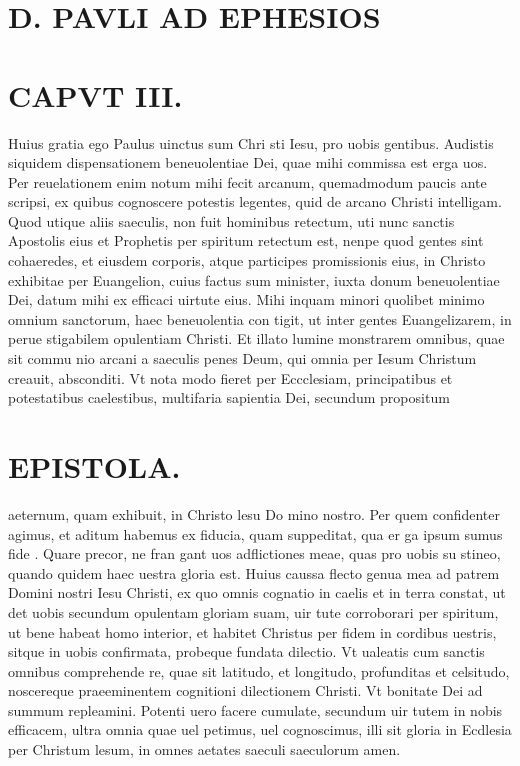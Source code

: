 \documentclass{article}
\begin{document}
\begin{pages}
\section*{D. PAVLI AD EPHESIOS }
\marginpar{[ p.1. ]}
\marginpar{[ p.2. ]}
\marginpar{[ p.3. ]}
\marginpar{[ p.4.  ]}
\section{CAPVT III. }\pstart Huius gratia ego Paulus uinctus sum Chri sti Iesu, pro uobis gentibus.  Audistis siquidem dispensationem beneuolentiae Dei, quae mihi commissa est erga uos. Per reuelationem enim notum mihi fecit arcanum, quemadmodum paucis ante scripsi, ex quibus  cognoscere potestis legentes, quid de arcano Christi intelligam.  \pend\pstart Quod utique  aliis saeculis, non fuit hominibus retectum, uti nunc sanctis Apostolis eius et Prophetis per spiritum retectum est, nenpe quod gentes sint cohaeredes, et eiusdem corporis, atque participes promissionis eius, in Christo exhibitae per Euangelion, cuius factus sum minister, iuxta donum beneuolentiae Dei, datum mihi ex efficaci uirtute eius.  \pend\pstart Mihi inquam minori quolibet minimo omnium sanctorum, haec beneuolentia con tigit, ut inter gentes Euangelizarem, in perue stigabilem opulentiam Christi. Et illato lumine monstrarem omnibus, quae sit commu nio arcani a saeculis penes Deum, qui omnia per Iesum Christum creauit, absconditi.  \pend\pstart Vt nota modo fieret per Eccclesiam, principatibus et potestatibus caelestibus, multifaria sapientia Dei, secundum propositum  \pend
\section*{EPISTOLA.  }
\marginpar{[ p.12 ]}
\marginpar{[ p.5.  ]}
\marginpar{[ p.6.  ]}
\marginpar{[ p.7. ]}
\marginpar{[ p.8. ]}
\marginpar{[ p.9. ]}\pstart aeternum, quam exhibuit, in Christo lesu Do mino nostro.  \pend\pstart Per quem confidenter agimus, et aditum habemus ex fiducia, quam suppeditat, qua er ga ipsum sumus fide . Quare precor, ne fran gant uos adflictiones meae, quas pro uobis su stineo, quando quidem haec uestra gloria est.  \pend\pstart Huius caussa flecto genua mea ad patrem Domini nostri Iesu Christi, ex quo omnis cognatio in caelis et in terra constat, ut det uobis secundum opulentam gloriam suam, uir tute corroborari per spiritum, ut bene habeat homo interior, et habitet Christus per fidem in cordibus uestris, sitque  in uobis confirmata, probeque  fundata dilectio.  \pend\pstart Vt ualeatis cum sanctis omnibus comprehende re, quae sit latitudo, et longitudo, profunditas et celsitudo, noscereque  praeeminentem cognitioni dilectionem Christi. Vt bonitate Dei ad summum repleamini.  \pend\pstart Potenti uero facere cumulate, secundum uir tutem in nobis efficacem, ultra omnia quae uel petimus, uel cognoscimus, illi sit gloria in Ecdlesia per Christum lesum, in omnes aetates saeculi saeculorum amen.  \pend

\end{pages}
\end{document}
